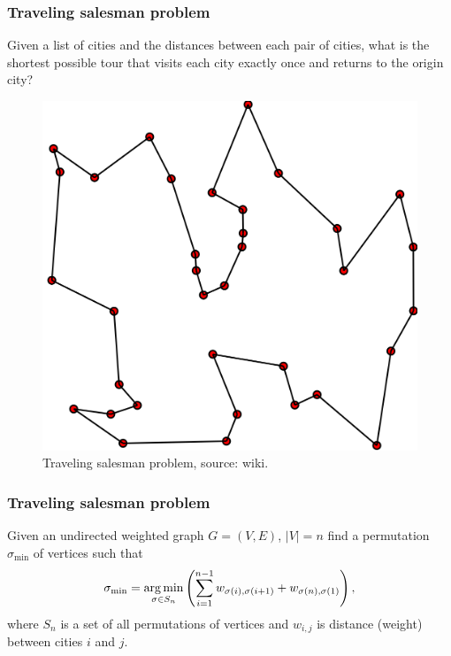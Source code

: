 \begin{frame}
	\frametitle{Traveling salesman problem}
	\begin{definition}[TSP]
		Given a list of cities and the distances between each pair of cities, what is the shortest possible tour that visits each city exactly once and returns to the origin city?
	\end{definition}
	\begin{figure}
		\centering
		\includegraphics[scale=0.13]{img/travelling_salesman_problem}
		\caption{Traveling salesman problem, source: wiki.}
	\end{figure}
\end{frame}

\begin{frame}
	\frametitle{Traveling salesman problem}
	\begin{definition}
		Given an undirected weighted graph $G = (V, E)$, $|V| = n$ find a permutation $\sigma_{\min}$ of vertices such that
		\begin{equation*}
		\sigma_{\min} = \underset{\sigma \in S_n}{\operatorname*{arg\,min}} \left( \sum_{i=1}^{n-1} w_{\sigma(i), \sigma(i+1)} + w_{\sigma(n), \sigma(1)} \right),
		\end{equation*}
		where $S_n$ is a set of all permutations of vertices and $w_{i,j}$ is distance (weight) between cities $i$ and $j$.
	\end{definition}
\end{frame}
